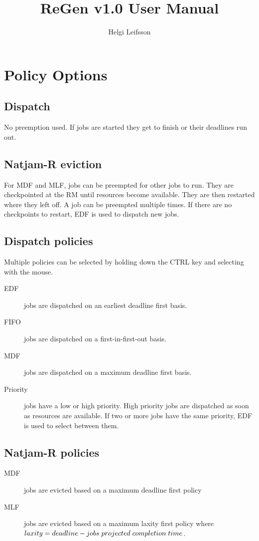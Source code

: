 \documentclass[11pt,oneside,a4paper]{article}
\title{ReGen v1.0 User Manual}
\author{Helgi Leifsson}
\begin{document}
\maketitle

\section{Policy Options}

\subsection{Dispatch}
No preemption used. If jobs are started they get to finish or their deadlines run out.

\subsection{Natjam-R eviction}
For MDF and MLF, jobs can be preempted for other jobs to run. They are checkpointed at the RM until resources become available. They are then restarted where they left off. A job can be preempted multiple times. If there are no checkpoints to restart, EDF is used to dispatch new jobs.

\subsection{Dispatch policies}
Multiple policies can be selected by holding down the CTRL key and selecting with the mouse.
\begin{description}
\item[EDF] jobs are dispatched on an earliest deadline first basis.
\item[FIFO] jobs are dispatched on a first-in-first-out basis.
\item[MDF] jobs are dispatched on a maximum deadline first basis.
\item[Priority] jobs have a low or high priority. High priority jobs are dispatched as soon as resources are available. If two or more jobs have the same priority, EDF is used to select between them.
\end{description}

\subsection{Natjam-R policies}

\begin{description}
\item[MDF] jobs are evicted based on a maximum deadline first policy
\item[MLF] jobs are evicted based on a maximum laxity first policy where $laxity = deadline - jobs \hspace{1mm} projected \hspace{1mm} completion \hspace{1mm} time$.
\end{description}
\end{document}

